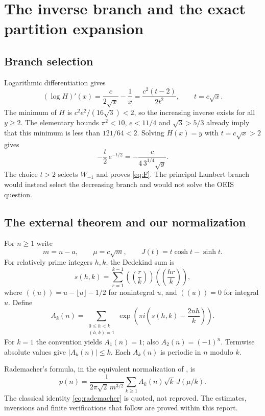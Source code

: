 \documentclass[11pt]{article}
\numberwithin{equation}{section}
\theoremstyle{definition}
\theoremstyle{remark}
\begin{document}
\section{The inverse branch and the exact partition expansion}
\subsection{Branch selection}
Logarithmic differentiation gives
\begin{equation}\label{eq:logderivative}
 (\log H)'(x)=\frac{c}{2\sqrt x}-\frac1x
 =\frac{c^2(t-2)}{2t^2},\qquad t=c\sqrt x.
\end{equation}
The minimum of $H$ is $c^2e^2/(16\sqrt3)<2$, so the increasing inverse
exists for all $y\ge2$. The elementary bounds $\pi^2<10$, $e<11/4$ and
$\sqrt3>5/3$ already imply that this minimum is less than $121/64<2$.
Solving $H(x)=y$ with $t=c\sqrt x>2$ gives
\[
 -\frac t2\,e^{-t/2}=-\frac{c}{4\,3^{1/4}\sqrt y}.
\]
The choice $t>2$ selects $W_{-1}$ and proves \eqref{eq:F}. The principal
Lambert branch would instead select the decreasing branch and would not
solve the OEIS question.

\subsection{The external theorem and our normalization}
For $n\ge1$ write
\begin{equation}\label{eq:mu}
 m=n-a,\qquad \mu=c\sqrt m,\qquad J(t)=t\cosh t-\sinh t.
\end{equation}
For relatively prime integers $h,k$, the Dedekind sum is
\[
 s(h,k)=\sum_{r=1}^{k-1}
 \left(\!\left(\frac rk\right)\!\right)
 \left(\!\left(\frac{hr}k\right)\!\right),
\]
where $((u))=u-\lfloor u\rfloor-1/2$ for nonintegral $u$, and $((u))=0$
for integral $u$. Define
\begin{equation}\label{eq:Ak}
 A_k(n)=\sum_{\substack{0\le h<k\\(h,k)=1}}
 \exp\!\left(\pi i\left(s(h,k)-\frac{2nh}{k}\right)\right).
\end{equation}
For $k=1$ the convention yields $A_1(n)=1$; also
$A_2(n)=(-1)^n$. Termwise absolute values give $|A_k(n)|\le k$.
Each $A_k(n)$ is periodic in $n$ modulo $k$.

Rademacher's formula, in the equivalent normalization of
\cite[Section~1]{johansson}, is
\begin{equation}\label{eq:rademacher}
 p(n)=\frac1{2\pi\sqrt2\,m^{3/2}}
 \sum_{k\ge1}A_k(n)\sqrt k\,J(\mu/k).
\end{equation}
The classical identity \eqref{eq:rademacher} is quoted, not reproved.
The estimates, inversions and finite verifications that follow are
proved within this report.
\end{document}
